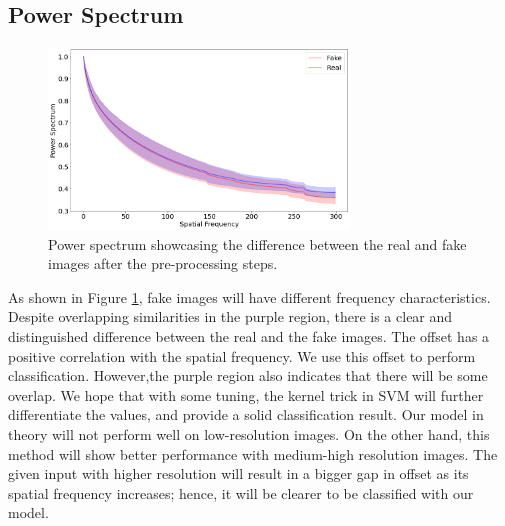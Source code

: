 \documentclass[11pt,twocolumn,letterpaper]{article}
\begin{document}
\subsection{Power Spectrum}
\begin{figure}%
    \includegraphics[width=8cm]{power-spectrum}
    \caption{Power spectrum showcasing the difference between the real and fake images after the pre-processing steps.}
    \label{fig:power-spectrum}
\end{figure}
As shown in Figure \ref{fig:power-spectrum}, fake images will have different frequency characteristics. Despite overlapping similarities in the purple region, there is a clear and distinguished difference between the real and the fake images. The offset has a positive correlation with the spatial frequency. We use this offset to perform classification. However,the purple region also indicates that there will be some overlap. We hope that with some tuning, the kernel trick in SVM will further differentiate the values, and provide a solid classification result. Our model in theory will not perform well on low-resolution images. On the other hand, this method will show better performance with medium-high resolution images. The given input with higher resolution will result in a bigger gap in offset as its spatial frequency increases; hence, it will be clearer to be classified with our model.
\end{document}
